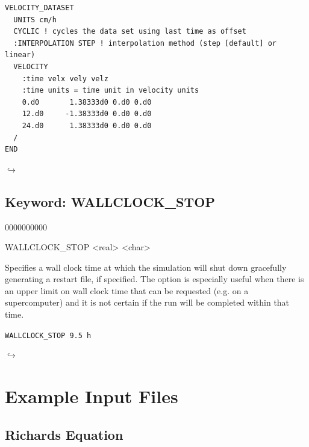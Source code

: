 \documentclass[12pt]{article}
\newcommand\return{{\hfill$\hookrightarrow$}}
\begin{document}

\begin{verbatim}
VELOCITY_DATASET
  UNITS cm/h
  CYCLIC ! cycles the data set using last time as offset
  :INTERPOLATION STEP ! interpolation method (step [default] or linear)
  VELOCITY
    :time velx vely velz
    :time units = time unit in velocity units
    0.d0       1.38333d0 0.d0 0.d0 
    12.d0     -1.38333d0 0.d0 0.d0 
    24.d0      1.38333d0 0.d0 0.d0 
  /
END
\end{verbatim}

\hyperlink{target_key}{\return}


\newpage
\protect\hypertarget{target_wallclk}{}

\subsection{Keyword: WALLCLOCK\_STOP}
\begin{deflist}{0000000000}
\item[WALLCLOCK\_STOP] <real> <char>
\end{deflist}

 Specifies a wall clock time at which the simulation will shut down gracefully generating a restart file, if specified. The option is especially useful when there is an upper limit on wall clock time that can be requested (e.g. on a supercomputer) and it is not certain if the run will be completed within that time.

 {\tt WALLCLOCK\_STOP 9.5 h}


\hyperlink{target_key}{\return}

\newpage
\section{Example Input Files}

\subsection{Richards Equation}
\end{document}
